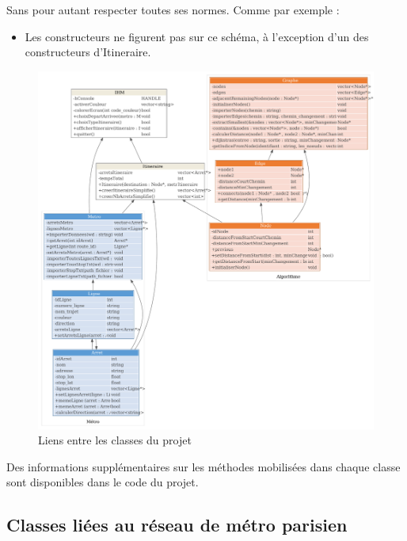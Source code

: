 \documentclass[,french]{article}
\providecommand{\tightlist}{%
  \setlength{\itemsep}{0pt}\setlength{\parskip}{0pt}}
\begin{document}
Sans pour autant respecter toutes ses normes. Comme par exemple :

\begin{itemize}
\tightlist
\item
  Les constructeurs ne figurent pas sur ce schéma, à l'exception d'un
  des constructeurs d'Itineraire.
\end{itemize}

\begin{figure}

{\centering \includegraphics{./img/Diagramme_classes/diagramme_classes} 

}

\caption{Liens entre les classes du projet}\label{fig:unnamed-chunk-1}
\end{figure}

Des informations supplémentaires sur les méthodes mobilisées dans chaque
classe sont disponibles dans le code du projet.

\hypertarget{classes-liuxe9es-au-ruxe9seau-de-muxe9tro-parisien}{%
\subsection{Classes liées au réseau de métro
parisien}\label{classes-liuxe9es-au-ruxe9seau-de-muxe9tro-parisien}}
\end{document}
